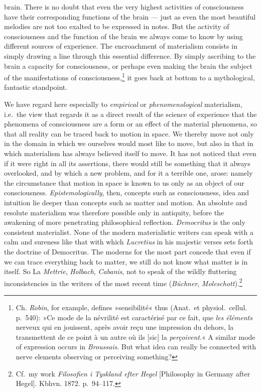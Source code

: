 \documentclass[12pt,a4paper]{book}
\newcommand{\opage}[1]{\marginnote{\footnotesize\textit{[#1]}}}
\begin{document}
brain. There is no doubt that even the very highest activities of
consciousness have their corresponding functions of the brain --- just
as even the most beautiful melodies are not too exalted to be expressed
in notes. But the activity of consciousness and the function of the
brain we always come
\opage{73}to know by using different sources of experience. The
encroachment of materialism consists in simply drawing a line through
this essential difference. By simply ascribing to the brain a capacity
for consciousness, or perhaps even making the brain the subject of the
manifestations of consciousness,\footnote{Ch. \emph{Robin}, for
example, defines »sensibilité« thus (Anat.\ et physiol.\ cellul.
p.~540): »Ce mode de la névrilité est caractérisé par ce fait, que
\emph{les éléments} nerveux qui en jouissent, après avoir reçu une
impression du dehors, la transmettent de ce point à un autre où ils
[sic] la \emph{perçoivent}.« A similar mode of expression occurs in
\emph{Broussais}. But what idea can really be connected with nerve
elements observing or perceiving something?} it goes back at bottom to
a mythological, fantastic standpoint.

We have regard here especially to \emph{empirical} or
\emph{phenomenological} materialism, i.e.\ the view that regards it as a
direct result of the science of experience that the phenomena of
consciousness are a form or an effect of the material phenomena, so
that all reality can be traced back to motion in space. We thereby move
not only in the domain in which we ourselves would most like to move,
but also in that in which materialism has always believed itself to
move. It has not noticed that even if it were right in all its
assertions, there would still be something that it always overlooked,
and by which a new problem, and for it a terrible one, arose: namely the
circumstance that motion in space is known to us only as an object of
our consciousness. \emph{Epistemologically}, then, concepts such as
consciousness, idea and intuition lie deeper than concepts such as
matter and motion. An absolute and resolute materialism was therefore
possible only in antiquity, before the awakening of more penetrating
philosophical reflection. \emph{Democritus} is the only consistent
materialist. None of the modern materialistic writers can speak with a
calm and sureness like that with which \emph{Lucretius} in his majestic
verses sets forth the doctrine of Democritus. The moderns for the most
part concede that even if we can trace everything back to matter, we
still do not know what matter is in itself. So La \emph{Mettrie},
\emph{Holbach}, \emph{Cabanis}, not to speak of the
\opage{74}wildly fluttering inconsistencies in the writers of the most
recent time (\emph{Büchner}, \emph{Moleschott}).\footnote{Cf.\ my work
\textit{Filosofien i Tyskland efter Hegel} [Philosophy in Germany after
Hegel]. Kbhvn. 1872. p.~94--117.}
\end{document}
